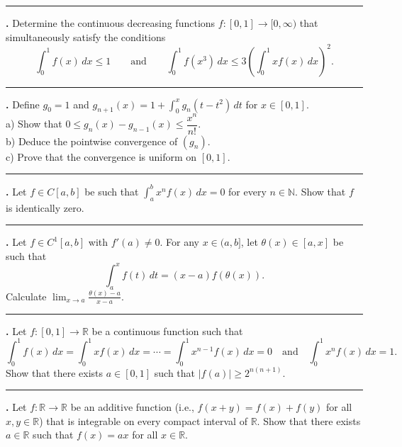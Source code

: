 \documentclass[11pt]{article}
\newcounter{probnum}
\newenvironment{problembox}{\par\noindent\rule{\linewidth}{0.5pt}\vspace{5pt}\par}{\vspace{2pt}}
\begin{document}
\begin{problembox}
\textbf{\theprobnum.} Determine the continuous decreasing functions $f : [0,1] \to [0,\infty)$ that simultaneously satisfy the conditions
\[
\int_0^1 f(x)\,dx \le 1 \qquad \text{and} \qquad \int_0^1 f(x^3)\,dx \le 3\left(\int_0^1 x f(x)\,dx\right)^2.
\]
\end{problembox}

\begin{problembox}
\textbf{\theprobnum.} Define $g_0 = 1$ and $g_{n+1}(x) = 1 + \displaystyle\int_0^x g_n(t-t^2)\,dt$ for $x \in [0,1]$.\\
a) Show that $0 \le g_n(x) - g_{n-1}(x) \le \dfrac{x^n}{n!}$.\\
b) Deduce the pointwise convergence of $(g_n)$.\\
c) Prove that the convergence is uniform on $[0,1]$.
\end{problembox}

\begin{problembox}
\textbf{\theprobnum.} Let $f \in C[a,b]$ be such that $\displaystyle\int_a^b x^n f(x)\,dx = 0$ for every $n \in \mathbb{N}$. Show that $f$ is identically zero.
\end{problembox}

\begin{problembox}
\textbf{\theprobnum.} Let $f \in C^1[a,b]$ with $f'(a) \ne 0$. For any $x \in (a,b]$, let $\theta(x) \in [a,x]$ be such that
\[
\int_a^x f(t)\,dt = (x-a) f(\theta(x)).
\]
Calculate $\displaystyle\lim_{x \to a} \frac{\theta(x)-a}{x-a}$.
\end{problembox}

\begin{problembox}
\textbf{\theprobnum.} Let $f : [0,1] \to \mathbb{R}$ be a continuous function such that
\[
\int_0^1 f(x)\,dx = \int_0^1 x f(x)\,dx = \cdots = \int_0^1 x^{n-1} f(x)\,dx = 0
\quad \text{and} \quad \int_0^1 x^n f(x)\,dx = 1.
\]
Show that there exists $a \in [0,1]$ such that $|f(a)| \ge 2^{n(n+1)}$.
\end{problembox}

\begin{problembox}
\textbf{\theprobnum.} Let $f : \mathbb{R} \to \mathbb{R}$ be an additive function (i.e., $f(x+y)=f(x)+f(y)$ for all $x,y \in \mathbb{R}$) that is integrable on every compact interval of $\mathbb{R}$. Show that there exists $a \in \mathbb{R}$ such that $f(x) = ax$ for all $x \in \mathbb{R}$.
\end{problembox}
\end{document}
